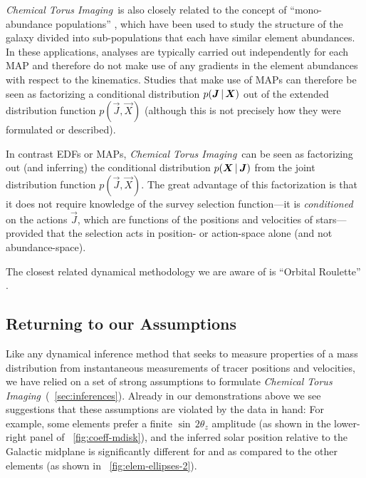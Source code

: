 \documentclass[modern]{aastex63}
\newcommand{\methodname}{\textsl{Chemical Torus Imaging}}
\begin{document}
\methodname\ is also closely related to the concept of ``mono-abundance
populations'' \citep[MAPs; e.g.,][]{Bovy:2012, Bovy:2016, Mackereth:2020}, which
have been used to study the structure of the galaxy divided into sub-populations
that each have similar element abundances.
In these applications, analyses are typically carried out independently for each
MAP and therefore do not make use of any gradients in the element abundances
with respect to the kinematics.
Studies that make use of MAPs can therefore be seen as factorizing a conditional
distribution $p(\boldsymbol{J}\,|\,\boldsymbol{X})$ out of the extended distribution function
$p(\vec{J},\vec{X})$ (although this is not precisely how they were formulated or
described).

In contrast EDFs or MAPs, \methodname\ can be seen as factorizing out (and
inferring) the conditional distribution $p(\boldsymbol{X}\,|\,\boldsymbol{J})$ from the joint
distribution function $p(\vec{J}, \vec{X})$.
The great advantage of this factorization is that it does not require knowledge
of the survey selection function---it is \emph{conditioned} on the actions
$\vec{J}$, which are functions of the positions and velocities of
stars---provided that the selection acts in position- or action-space alone (and
not abundance-space).

The closest related dynamical methodology we are aware of is ``Orbital
Roulette'' \citep{TODO}.



\subsection{Returning to our Assumptions}

Like any dynamical inference method that seeks to measure properties of a mass
distribution from instantaneous measurements of tracer positions and velocities,
we have relied on a set of strong assumptions to formulate \methodname\
(\sectionname~\ref{sec:inferences}).
Already in our demonstrations above we see suggestions that these assumptions
are violated by the data in hand: For example, some elements prefer a finite
$\sin\,2\theta_z$ amplitude (as shown in the lower-right panel of
\figurename~\ref{fig:coeff-mdisk}), and the inferred solar position relative to
the Galactic midplane is significantly different for \abunratio{Mg}{Fe} and
\abunratio{Si}{Fe} as compared to the other elements (as shown in
\figurename~\ref{fig:elem-ellipses-2}).
\end{document}
